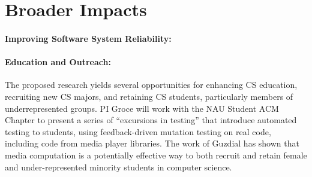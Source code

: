 \section{Broader Impacts}

\paragraph{Improving Software System Reliability:} 

\paragraph{Education and Outreach:}
The proposed research yields several opportunities for enhancing CS
education, recruiting new CS majors, and retaining CS students,
particularly members of underrepresented groups.  
PI Groce will work with the NAU Student ACM Chapter to present a
series of ``excursions in testing'' that introduce automated testing
to students, using feedback-driven mutation testing on real code, including code from
media player libraries.  The work of Guzdial
\cite{Guzdial} has shown that media computation is a
potentially effective way to both recruit and retain female and
under-represented minority students in computer science.
